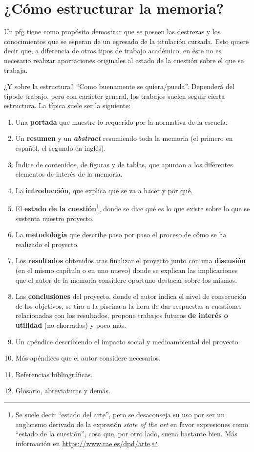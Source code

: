 \documentclass[%
    school=etsisi,%
    type=pfg,%
    degree=61CI,%
]{upm-report}
\begin{document}
\chapter{¿Cómo estructurar la memoria?}
\label{s:como-estructurar}

Un \gls{pfg} tiene como propósito demostrar que se poseen las destrezas
y los conocimientos que se esperan de un egresado de la titulación
cursada. Esto quiere decir que, a diferencia de otros tipos de trabajo
académico, en éste no es necesario realizar aportaciones originales al
estado de la cuestión sobre el que se trabaja.

¿Y sobre la estructura? \enquote{Como buenamente se quiera/pueda}.
Dependerá del tipode trabajo, pero con carácter general, los trabajos
suelen seguir cierta estructura. La típica suele ser la siguiente:

\begin{enumerate}
    \item Una \textbf{portada} que muestre lo requerido por la normativa
        de la escuela.
    \item Un \textbf{resumen} y un \textbf{\textit{abstract}} resumiendo
        toda la memoria (el primero en español, el segundo en inglés).
    \item Índice de contenidos, de figuras y de tablas, que apuntan a
        los diferentes elementos de interés de la memoria.
    \item La \textbf{introducción}, que explica qué se va a hacer y por
        qué.
    \item El \textbf{estado de la cuestión}\footnote{Se suele decir
        \enquote{estado del arte}, pero se desaconseja su uso por ser
        un anglicismo derivado de la expresión \textit{state of the art}
        en favor expresiones como \enquote{estado de la cuestión}, cosa
        que, por otro lado, suena bastante bien. Más información en
        \url{https://www.rae.es/dpd/arte}.}, donde se dice qué es lo que
        existe sobre lo que se sustenta nuestro proyecto.
    \item La \textbf{metodología} que describe paso por paso el proceso
        de cómo se ha realizado el proyecto.
    \item Los \textbf{resultados} obtenidos tras finalizar el proyecto
        junto con una \textbf{discusión} (en el mismo capítulo o en uno
        nuevo) donde se explican las implicaciones que el autor de la
        memoria considere oportuno destacar sobre los mismos.
    \item Las \textbf{conclusiones} del proyecto, donde el autor indica
        el nivel de consecución de los objetivos, se tira a la piscina
        a la hora de dar respuestas a cuestiones relacionadas con los
        resultados, propone trabajos futuros \textbf{de interés o
        utilidad} (no chorradas) y poco más.
    \item Un apéndice describiendo el impacto social y medioambiental
        del proyecto.
    \item Más apéndices que el autor considere necesarios.
    \item Referencias bibliográficas.
    \item Glosario, abreviaturas y demás.
\end{enumerate}
\end{document}
